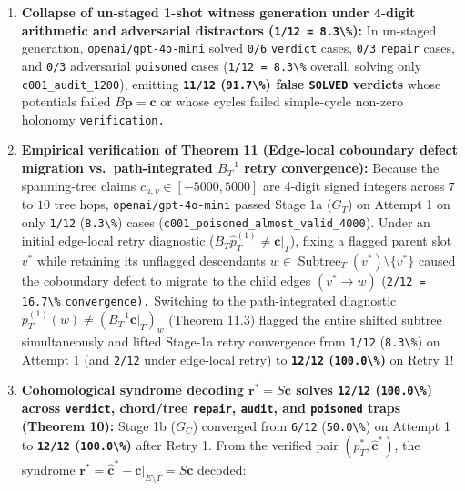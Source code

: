 \documentclass[
  11pt,
]{article}
\newcommand{\passthrough}[1]{#1}
\providecommand{\tightlist}{%
  \setlength{\itemsep}{0pt}\setlength{\parskip}{0pt}}
\begin{document}
\begin{enumerate}
\def\labelenumi{\arabic{enumi}.}
\tightlist
\item
  \textbf{Collapse of un-staged 1-shot witness generation under 4-digit
  arithmetic and adversarial distractors
  (\passthrough{\lstinline!1/12 = 8.3\%!}):} In un-staged generation,
  \nolinkurl{openai/gpt-4o-mini} solved \passthrough{\lstinline!0/6!}
  \passthrough{\lstinline!verdict!} cases, \passthrough{\lstinline!0/3!}
  \passthrough{\lstinline!repair!} cases, and
  \passthrough{\lstinline!0/3!} adversarial
  \passthrough{\lstinline!poisoned!} cases
  (\passthrough{\lstinline!1/12 = 8.3\%!} overall, solving only
  \nolinkurl{c001_audit_1200}), emitting
  \textbf{\passthrough{\lstinline!11/12!}
  (\passthrough{\lstinline!91.7\%!}) false
  \passthrough{\lstinline!SOLVED!} verdicts} whose potentials failed
  \(B\mathbf{p} = \mathbf{c}\) or whose cycles failed simple-cycle
  non-zero holonomy \nolinkurl{verification.}
\item
  \textbf{Empirical verification of Theorem 11 (Edge-local coboundary
  defect migration vs.~path-integrated \(B_T^{-1}\) retry convergence):}
  Because the spanning-tree claims
  \(c_{u,\allowbreak v} \in [-5000,\allowbreak  5000]\) are 4-digit
  signed integers across \(7\) to \(10\) tree hops,
  \nolinkurl{openai/gpt-4o-mini} passed Stage 1a (\(G_T\)) on Attempt 1
  on only \passthrough{\lstinline!1/12!}
  (\passthrough{\lstinline!8.3\%!}) cases
  (\nolinkurl{c001_poisoned_almost_valid_4000}). Under an initial
  edge-local retry diagnostic
  (\(B_T \hat{p}_T^{(1)} \ne \mathbf{c}|_T\)), fixing a flagged parent
  slot \(v^*\) while retaining its unflagged descendants
  \(w \in \operatorname{Subtree}_T(v^*) \setminus \{v^*\}\) caused the
  coboundary defect to migrate to the child edges \((v^* \to w)\)
  (\passthrough{\lstinline!2/12 = 16.7\%!} \nolinkurl{convergence).}
  Switching to the path-integrated diagnostic
  \(\hat{p}_T^{(1)}(w) \ne (B_T^{-1}\mathbf{c}|_T)_w\) (Theorem 11.3)
  flagged the entire shifted subtree simultaneously and lifted Stage-1a
  retry convergence from \passthrough{\lstinline!1/12!}
  (\passthrough{\lstinline!8.3\%!}) on Attempt 1 (and
  \passthrough{\lstinline!2/12!} under edge-local retry) to
  \textbf{\passthrough{\lstinline!12/12!}
  (\passthrough{\lstinline!100.0\%!})} on Retry 1!
\item
  \textbf{Cohomological syndrome decoding \(\mathbf{r}^* = S\mathbf{c}\)
  solves \passthrough{\lstinline!12/12!}
  (\passthrough{\lstinline!100.0\%!}) across
  \passthrough{\lstinline!verdict!}, chord/tree
  \passthrough{\lstinline!repair!}, \passthrough{\lstinline!audit!}, and
  \passthrough{\lstinline!poisoned!} traps (Theorem 10):} Stage 1b
  (\(G_C\)) converged from \passthrough{\lstinline!6/12!}
  (\passthrough{\lstinline!50.0\%!}) on Attempt 1 to
  \textbf{\passthrough{\lstinline!12/12!}
  (\passthrough{\lstinline!100.0\%!})} after Retry 1. From the verified
  pair \((p_T^*,\allowbreak  \hat{\mathbf{c}}^*)\), the syndrome
  \(\mathbf{r}^* = \hat{\mathbf{c}}^* - \mathbf{c}|_{E \setminus T} = S\mathbf{c}\)
  decoded:


\end{enumerate}
\end{document}
